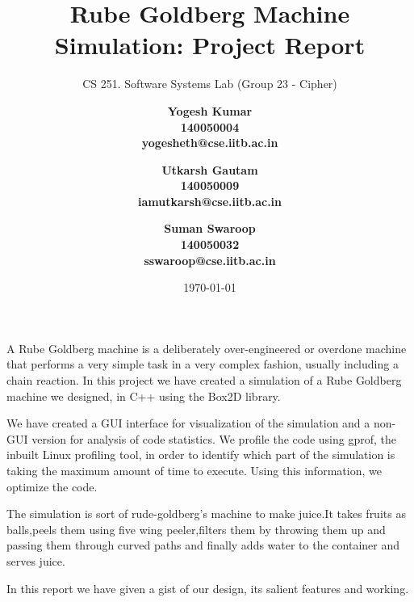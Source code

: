 \documentclass[a4paper,11pt]{resume}
\title{Rube Goldberg Machine Simulation: Project Report}
\subtitle{CS 251. Software Systems Lab (Group 23 - Cipher)}
\author{\bf{Yogesh Kumar}  \\
	140050004   \\
	yogesheth@cse.iitb.ac.in \\
	\and 
	\bf{Utkarsh Gautam} \\
	140050009  \\
	iamutkarsh@cse.iitb.ac.in \\
    \and 
    \bf{Suman Swaroop} \\
    140050032  \\
    sswaroop@cse.iitb.ac.in \\
    }
\date{\today}
\begin{document}
\maketitle

\begin{rSection}
{}
\begin{rSubsection}{}{}{}{}
\item A Rube Goldberg machine is a deliberately over-engineered or overdone machine that performs a very simple task in a very complex fashion, usually including a chain reaction. In this project we have created a simulation of a Rube Goldberg machine we designed, in C++ using the Box2D library.
\item We have created a GUI interface for visualization of the simulation and a non-GUI version for analysis of code statistics. We profile the code using gprof, the inbuilt Linux profiling tool, in order to identify which part of the simulation is taking the maximum amount of time to execute. Using this information, we optimize the code.
\item The simulation is sort of rude-goldberg's machine to make juice.It takes fruits as balls,peels them using five wing peeler,filters them by throwing them up and passing them through curved paths and finally adds water to the container and serves juice.
\item In this report we have given a gist of our design, its salient features and working. 

\end{rSubsection}
\end{rSection}
\end{document}

